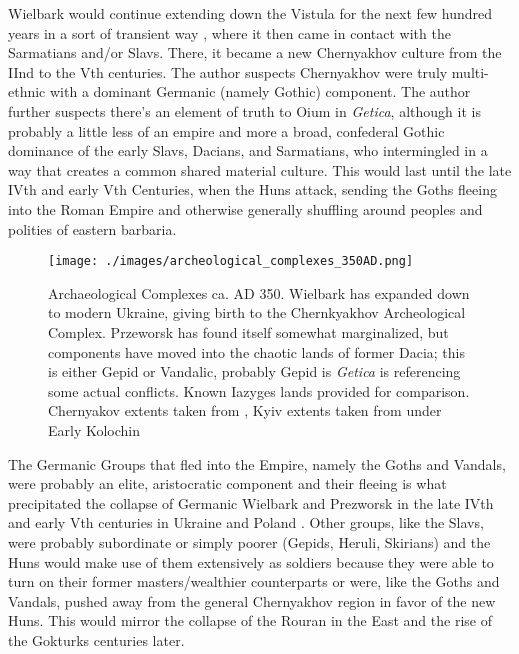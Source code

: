 \documentclass{article}
\begin{document}
	Wielbark would continue extending down the Vistula for the next few hundred years in a sort of transient way \cite{HeatherEmpiresAndBarbarians}, where it then came in contact with the Sarmatians and/or Slavs.
	There, it became a new Chernyakhov culture from the IInd to the Vth centuries.
	The author suspects Chernyakhov were truly multi-ethnic with a dominant Germanic (namely Gothic) component.
	The author further suspects there’s an element of truth to Oium in \textit{Getica}, although it is probably a little less of an empire and more a broad, confederal Gothic dominance of the early Slavs, Dacians, and Sarmatians, who intermingled in a way that creates a common shared material culture.
	This would last until the late IVth and early Vth Centuries, when the Huns attack, sending the Goths fleeing into the Roman Empire and otherwise generally shuffling around peoples and polities of eastern barbaria. 
	
	\begin{figure}[h!]
		\centering
		\texttt{[image: ./images/archeological\_complexes\_350AD.png]}
		\caption{Archaeological Complexes ca. AD 350.
			\newline\tiny Wielbark has expanded down to modern Ukraine, giving birth to the Chernkyakhov Archeological Complex.
			Przeworsk has found itself somewhat marginalized, but components have moved into the chaotic lands of former Dacia; this is either Gepid or Vandalic, probably Gepid is \textit{Getica} is referencing some actual conflicts. Known Iazyges lands provided for comparison. Chernyakov extents taken from \cite{HeatherEmpiresAndBarbarians,IndoEuroEncyclopedia}, Kyiv extents taken from \cite{IndoEuroEncyclopedia} under Early Kolochin}
	\end{figure}
	
	The Germanic Groups that fled into the Empire, namely the Goths and Vandals, were probably an elite, aristocratic component and their fleeing is what precipitated the collapse of Germanic Wielbark and Prezworsk in the late IVth and early Vth centuries in Ukraine and Poland \cite{HeatherEmpiresAndBarbarians}.
	Other groups, like the Slavs, were probably subordinate or simply poorer (Gepids, Heruli, Skirians) and the Huns would make use of them extensively as soldiers because they were able to turn on their former masters/wealthier counterparts or were, like the Goths and Vandals, pushed away from the general Chernyakhov region in favor of the new Huns.
	This would mirror the collapse of the Rouran in the East and the rise of the Gokturks centuries later.
	
\end{document}
